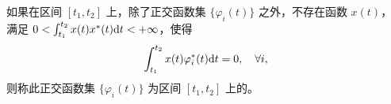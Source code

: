 \begin{definition}[完备的正交函数集]
    如果在区间 $[t_1, t_2]$ 上，除了正交函数集 $\{\varphi_i(t)\}$ 之外，不存在函数 $x(t)$，
    满足 $0 < \int_{t_1}^{t_2}x(t)x^*(t)\mathrm{d}t < +\infty$，使得
    \begin{align*}
        \int_{t_1}^{t_2}x(t)\varphi_i^*(t)\mathrm{d}t = 0, \quad \forall i,
    \end{align*}
    则称此正交函数集 $\{\varphi_i(t)\}$ 为区间 $[t_1, t_2]$ 上的。
\end{definition}
